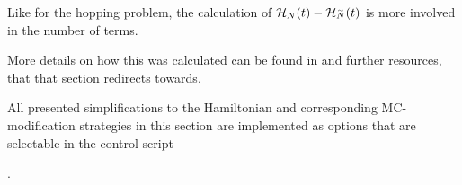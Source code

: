 Like for the hopping problem, the calculation of $\HNOft - \HNOft[\vphantom{N}\smash{\tilde{N}}]$ is more involved in the number of terms.

More details on how this was calculated can be found in  and further resources, that that section redirects towards.

\vspace{1cm}
All presented simplifications to the Hamiltonian and corresponding MC-modification strategies in this section are implemented as options that are selectable in the control-script   

.
 